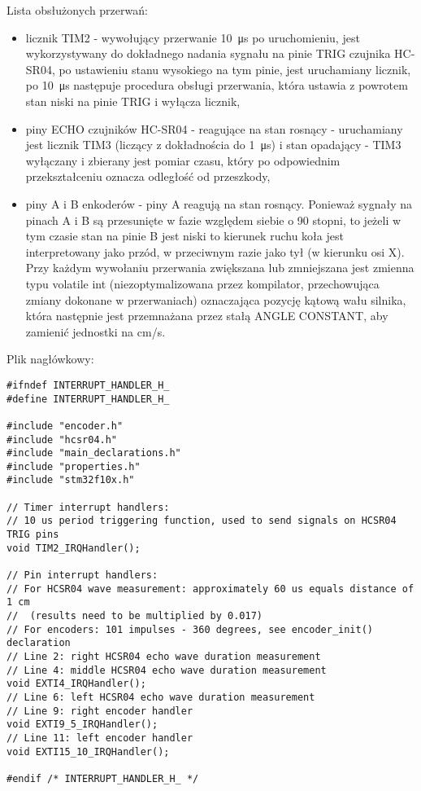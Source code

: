\documentclass[a4paper,12pt,twoside,openany]{report}
\begin{document}
\newpage
\noindent Lista obsłużonych przerwań:
\begin{itemize}
\item licznik TIM2 - wywołujący przerwanie \SI{10}{\micro s} po uruchomieniu, jest wykorzystywany do dokładnego nadania sygnału na pinie TRIG czujnika HC-SR04, po ustawieniu stanu wysokiego na tym pinie, jest uruchamiany licznik, po \SI{10}{\micro s} następuje procedura obsługi przerwania, która ustawia z powrotem stan niski na pinie TRIG i wyłącza licznik,
\item piny ECHO czujników HC-SR04 - reagujące na stan rosnący - uruchamiany jest licznik TIM3 (liczący z dokładnościa do \SI{1}{\micro s}) i stan opadający - TIM3 wyłączany i zbierany jest pomiar czasu, który po odpowiednim przekształceniu oznacza odległość od przeszkody,
\item piny A i B enkoderów - piny A reagują na stan rosnący. Ponieważ sygnały na pinach A i B są przesunięte w fazie względem siebie o 90 stopni, to jeżeli w tym czasie stan na pinie B jest niski to kierunek ruchu koła jest interpretowany jako przód, w przeciwnym razie jako tył (w kierunku osi X). Przy każdym wywołaniu przerwania zwiększana lub zmniejszana jest zmienna typu volatile int (niezoptymalizowana przez kompilator, przechowująca zmiany dokonane w przerwaniach) oznaczająca pozycję kątową wału silnika, która następnie jest przemnażana przez stałą ANGLE CONSTANT, aby zamienić jednostki na cm/s.
\end{itemize}
Plik nagłówkowy:\\
\begin{lstlisting}[style=customc]
#ifndef INTERRUPT_HANDLER_H_
#define INTERRUPT_HANDLER_H_

#include "encoder.h"
#include "hcsr04.h"
#include "main_declarations.h"
#include "properties.h"
#include "stm32f10x.h"

// Timer interrupt handlers:
// 10 us period triggering function, used to send signals on HCSR04 TRIG pins
void TIM2_IRQHandler();

// Pin interrupt handlers:
// For HCSR04 wave measurement: approximately 60 us equals distance of 1 cm
//  (results need to be multiplied by 0.017)
// For encoders: 101 impulses - 360 degrees, see encoder_init() declaration
// Line 2: right HCSR04 echo wave duration measurement
// Line 4: middle HCSR04 echo wave duration measurement
void EXTI4_IRQHandler();
// Line 6: left HCSR04 echo wave duration measurement
// Line 9: right encoder handler
void EXTI9_5_IRQHandler();
// Line 11: left encoder handler
void EXTI15_10_IRQHandler();

#endif /* INTERRUPT_HANDLER_H_ */


\end{lstlisting}
\end{document}
